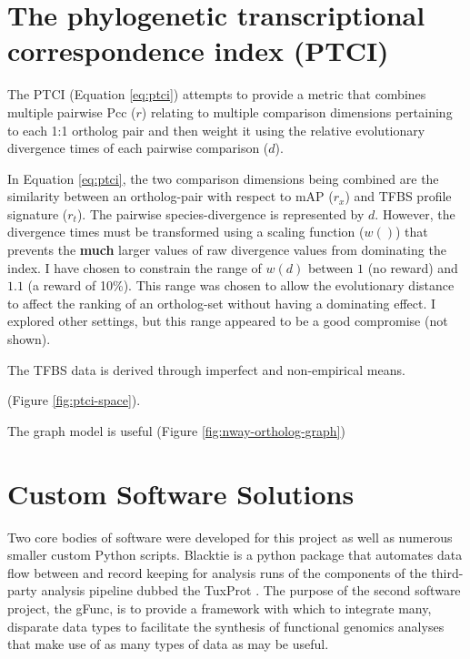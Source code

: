 \section{The phylogenetic transcriptional correspondence index (PTCI)} \label{sec:ptci}

The \gls{PTCI} (Equation \ref{eq:ptci}) attempts to provide a metric that combines multiple pairwise \gls{Pcc} ($r$) relating to multiple comparison dimensions pertaining to each 1:1 ortholog pair and then weight it using the relative evolutionary divergence times of each pairwise comparison ($d$).
%

%
In Equation \ref{eq:ptci}, the two comparison dimensions being combined are the similarity between an ortholog-pair with respect to \gls{mAP} ($r_{x}$) and \gls{TFBS} profile signature ($r_{t}$).
The pairwise species-divergence is represented by $d$.
However, the divergence times must be transformed using a scaling function ($w()$) that prevents the \textbf{much} larger values of raw divergence values from dominating the index.
I have chosen to constrain the range of $w(d)$ between $1$ (no reward) and $1.1$ (a reward of 10\%).
This range was chosen to allow the evolutionary distance to affect the ranking of an ortholog-set without having a dominating effect.
I explored other settings, but this range appeared to be a good compromise (not shown).
%

%
The \gls{TFBS} data is derived through imperfect and non-empirical means.


(Figure \ref{fig:ptci-space}).





The graph model is useful (Figure \ref{fig:nway-ortholog-graph})





\section{Custom Software Solutions}

Two core bodies of software were developed for this project as well as numerous smaller custom Python scripts.
Blacktie is a python package that automates data flow between and record keeping for analysis runs of the components of the third-party analysis pipeline dubbed the \gls{TuxProt} \cite{Trapnell2012}.
The purpose of the second software project, the \gls{gFunc}, is to provide a framework with which to integrate many, disparate data types to facilitate the synthesis of functional genomics analyses that make use of as many types of data as may be useful.

